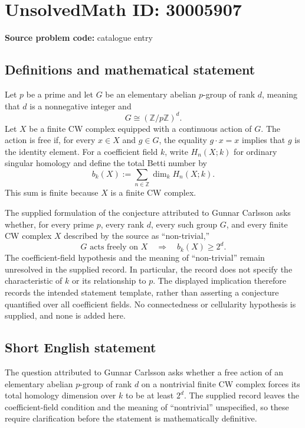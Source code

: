 \documentclass[11pt]{article}
\newcommand{\Z}{\mathbb{Z}}
\begin{document}
\section*{UnsolvedMath ID: 30005907}
\textbf{Source problem code:} catalogue entry
\subsection{Definitions and mathematical statement}
Let \(p\) be a prime and let \(G\) be an elementary abelian \(p\)-group of rank \(d\), meaning that \(d\) is a nonnegative integer and
\[
G\cong (\Z/p\Z)^d.
\]
Let \(X\) be a finite CW complex equipped with a continuous action of \(G\). The action is free if, for every \(x\in X\) and \(g\in G\), the equality \(g\cdot x=x\) implies that \(g\) is the identity element. For a coefficient field \(k\), write \(H_n(X;k)\) for ordinary singular homology and define the total Betti number by
\[
b_k(X):=\sum_{n\in\Z}\dim_k H_n(X;k).
\]
This sum is finite because \(X\) is a finite CW complex.

The supplied formulation of the conjecture attributed to Gunnar Carlsson asks whether, for every prime \(p\), every rank \(d\), every such group \(G\), and every finite CW complex \(X\) described by the source as ``non-trivial,''
\[
G\text{ acts freely on }X
\quad\Longrightarrow\quad
b_k(X)\geq 2^d.
\]
The coefficient-field hypothesis and the meaning of ``non-trivial'' remain unresolved in the supplied record. In particular, the record does not specify the characteristic of \(k\) or its relationship to \(p\). The displayed implication therefore records the intended statement template, rather than asserting a conjecture quantified over all coefficient fields. No connectedness or cellularity hypothesis is supplied, and none is added here.
\subsection{Short English statement}
The question attributed to Gunnar Carlsson asks whether a free action of an elementary abelian \(p\)-group of rank \(d\) on a nontrivial finite CW complex forces its total homology dimension over \(k\) to be at least \(2^d\). The supplied record leaves the coefficient-field condition and the meaning of ``nontrivial'' unspecified, so these require clarification before the statement is mathematically definitive.
\end{document}
